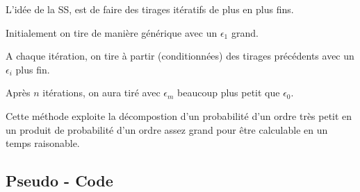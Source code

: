 \documentclass[french,12pt]{article}
\begin{document}
L'idée de la SS, est de faire des tirages itératifs de plus en plus fins.

Initialement on tire de manière générique avec un $\epsilon_1$ grand.

A chaque itération, on tire à partir (conditionnées) des tirages précédents avec un $\epsilon_i$ plus fin.

Après $n$ itérations, on aura tiré avec $\epsilon_m$ beaucoup plus petit que $\epsilon_0$.

Cette méthode exploite la décompostion d'un probabilité d'un ordre très petit
en un produit de probabilité d'un ordre assez grand pour être calculable en un temps raisonable.



\subsection{Pseudo - Code}

\end{document}
